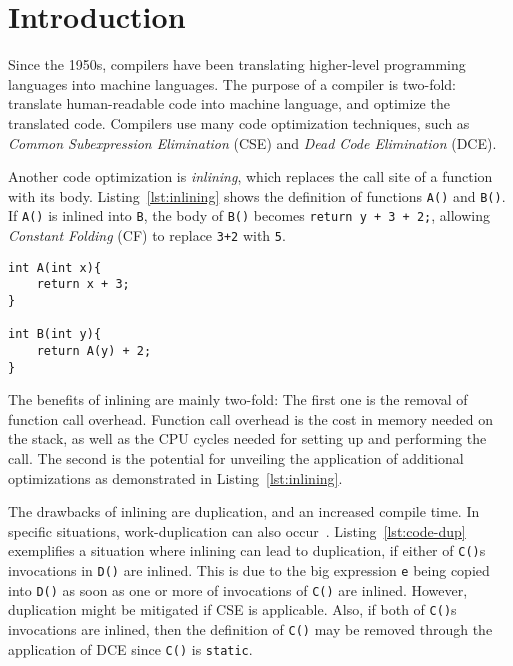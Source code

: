 
\section{Introduction}
\label{introduction}

Since the 1950s, compilers have been translating higher-level programming
languages into machine languages. The purpose of a compiler is two-fold:
translate human-readable code into machine language, and optimize the translated
code. Compilers use many code optimization techniques, such as \textit{Common
Subexpression Elimination} (CSE)\cite[Ch. 8.5]{DragonBook} and
\textit{Dead Code Elimination} (DCE)\cite[Ch. 8.5]{DragonBook}.

Another code optimization is \textit{inlining}, which replaces the call site of
a function with its body. Listing~\ref{lst:inlining} shows the definition of
functions \lstinline!A()! and \lstinline!B()!. If \lstinline!A()! is inlined
into \lstinline!B!, the body of \lstinline!B()! becomes
\lstinline!return y + 3 + 2;!, allowing
\textit{Constant Folding} (CF)\cite[Ch. 8.5]{DragonBook} to replace
\lstinline!3+2! with \lstinline!5!.

\begin{centering}
	\noindent\begin{minipage}{\textwidth}
		\begin{CenteredBox}
		\begin{lstlisting}[style=global_customcpp]
int A(int x){
	return x + 3;
}

int B(int y){
	return A(y) + 2;
}
		\end{lstlisting}
		\end{CenteredBox}
	\end{minipage}
	\label{lst:inlining}
\end{centering}

The benefits of inlining are mainly two-fold: The first one is the removal of
function call overhead. Function call overhead is the cost in memory needed on
the stack, as well as the CPU cycles needed for setting up and performing the
call. The second is the potential for unveiling the application of additional
optimizations as demonstrated in Listing~\ref{lst:inlining}.

The drawbacks of inlining are  duplication, and an increased compile time.
In specific situations, work-duplication can also occur~\cite{GHCPaper}.
Listing~\ref{lst:code-dup} exemplifies a situation where inlining can lead to
 duplication, if either of \lstinline!C()!s invocations in \lstinline!D()!
are inlined. This is due to the big expression \lstinline!e! being copied into
\lstinline!D()! as soon as one or more of invocations of \lstinline!C()! are
inlined. However,  duplication might be mitigated if CSE is applicable.
Also, if both of \lstinline!C()!s invocations are inlined,
then the definition of \lstinline!C()! may be removed through the application of
DCE since \lstinline!C()! is \lstinline!static!.

